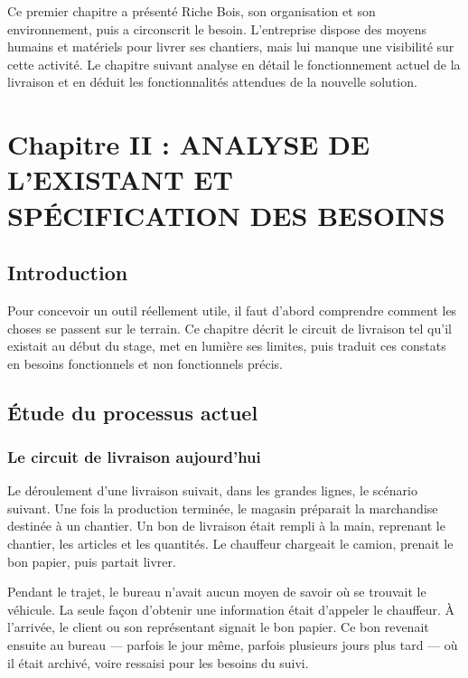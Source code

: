 \documentclass[12pt,a4paper]{report}
\begin{document}
Ce premier chapitre a présenté Riche Bois, son organisation et son environnement, puis a circonscrit le besoin. L'entreprise dispose des moyens humains et matériels pour livrer ses chantiers, mais lui manque une visibilité sur cette activité. Le chapitre suivant analyse en détail le fonctionnement actuel de la livraison et en déduit les fonctionnalités attendues de la nouvelle solution.

\newpage

\chapter{Chapitre II : ANALYSE DE L'EXISTANT ET SPÉCIFICATION DES BESOINS}

\section{Introduction}

Pour concevoir un outil réellement utile, il faut d'abord comprendre comment les choses se passent sur le terrain. Ce chapitre décrit le circuit de livraison tel qu'il existait au début du stage, met en lumière ses limites, puis traduit ces constats en besoins fonctionnels et non fonctionnels précis.

\section{Étude du processus actuel}

\subsection{Le circuit de livraison aujourd'hui}

Le déroulement d'une livraison suivait, dans les grandes lignes, le scénario suivant. Une fois la production terminée, le magasin préparait la marchandise destinée à un chantier. Un bon de livraison était rempli à la main, reprenant le chantier, les articles et les quantités. Le chauffeur chargeait le camion, prenait le bon papier, puis partait livrer.

Pendant le trajet, le bureau n'avait aucun moyen de savoir où se trouvait le véhicule. La seule façon d'obtenir une information était d'appeler le chauffeur. À l'arrivée, le client ou son représentant signait le bon papier. Ce bon revenait ensuite au bureau — parfois le jour même, parfois plusieurs jours plus tard — où il était archivé, voire ressaisi pour les besoins du suivi.
\end{document}
